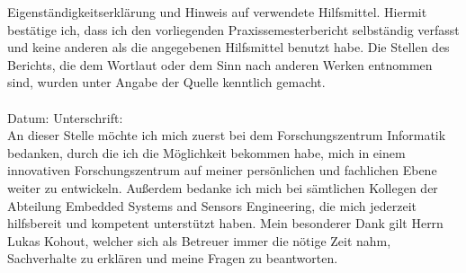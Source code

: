 \label{erklaerung}

Eigenständigkeitserklärung und Hinweis auf verwendete
Hilfsmittel.
Hiermit bestätige ich, dass ich den vorliegenden Praxissemesterbericht selbständig
verfasst und keine anderen als die angegebenen Hilfsmittel benutzt habe. Die Stellen
des Berichts, die dem Wortlaut oder dem Sinn nach anderen Werken entnommen sind,
wurden unter Angabe der Quelle kenntlich gemacht.\\
\\[1.5cm]
Datum:	\hrulefill\enspace Unterschrift: \hrulefill
\\[3.5cm]

\label{danksagungen}
An dieser Stelle möchte ich mich zuerst bei dem Forschungszentrum Informatik bedanken, durch die ich die
Möglichkeit bekommen habe, mich in einem innovativen Forschungszentrum auf meiner persönlichen und fachlichen Ebene weiter zu entwickeln.
Außerdem bedanke ich mich bei sämtlichen Kollegen der Abteilung Embedded Systems and Sensors Engineering, die
mich jederzeit hilfsbereit und kompetent unterstützt haben.
Mein besonderer Dank gilt Herrn Lukas Kohout, welcher sich
als Betreuer immer die nötige Zeit nahm, Sachverhalte zu erklären und meine Fragen zu beantworten.

